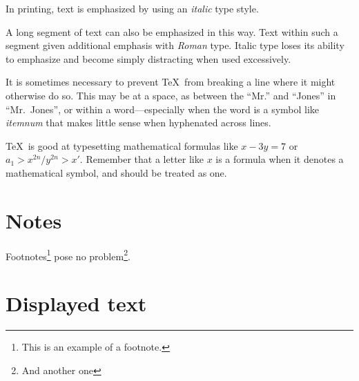 \documentclass[ss]{imsart}
\numberwithin{equation}{section}
\theoremstyle{plain}
\begin{document}
In printing, text is emphasized by using an
       {\em italic\/}  %
type style.

\begin{em}
   A long segment of text can also be emphasized in this way.  Text within
   such a segment given additional emphasis
      with\/ {\em Roman}
   type.  Italic type loses its ability to emphasize and become simply
   distracting when used excessively.
\end{em}

It is sometimes necessary to prevent \TeX\ from breaking a line where
it might otherwise do so.  This may be at a space, as between the
``Mr.'' and ``Jones'' in
       ``Mr.~Jones'',        %
or within a word---especially when the word is a symbol like
       \mbox{\em itemnum\/}
that makes little sense when hyphenated across
       lines.

\TeX\ is good at typesetting mathematical formulas like
       \( x-3y = 7 \)
or
       \( a_{1} > x^{2n} / y^{2n} > x' \).
Remember that a letter like
       $x$        %
is a formula when it denotes a mathematical symbol, and should
be treated as one.

\section{Notes}
Footnotes\footnote{This is an example of a footnote.}
pose no problem\footnote{And another one}.

\section{Displayed text}
\end{document}
